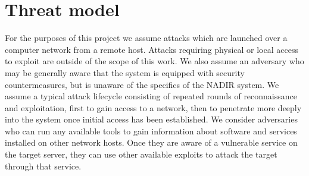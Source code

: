\section{Threat model}
\label{threat_model}

For the purposes of this project we assume attacks which are launched over a computer network from a remote host. Attacks requiring physical or local access to exploit are outside of the scope of this work. 
We also assume an adversary who may be generally aware that the system is equipped with security countermeasures, but is unaware of the specifics of the NADIR system. We assume a typical attack lifecycle 
consisting of repeated rounds of reconnaissance and exploitation, first to gain access to a network, then to penetrate more deeply into the system once initial access has been established. We consider 
adversaries who can run any available tools to gain information about software and services installed on other network hosts. Once they are aware of a vulnerable service on the target server, they can use 
other available exploits to attack the target through that service. 

